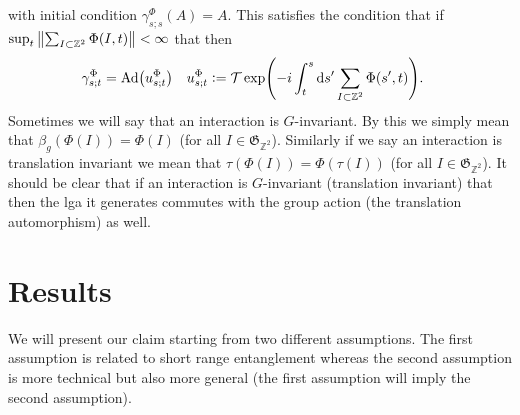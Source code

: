 \documentclass[12pt,a4paper,twoside]{article}
\renewcommand{\d}{\text{d}}
\newcommand{\defeq}{\vcentcolon=}
\let\originalleft\left
\let\originalright\right
\renewcommand{\left}{\mathopen{}\mathclose\bgroup\originalleft}
\renewcommand{\right}{\aftergroup\egroup\originalright}
\newcommand{\ZZ}{\mathbb Z}
\newcommand{\Ad}[1]{\textrm{Ad}\left(#1\right)}
\theoremstyle{definition}
\numberwithin{equation}{section}
\begin{document}
with initial condition $\gamma^{\Phi}_{s;s}(A)=A$. This satisfies the condition that if $\sup_t\norm{\sum_{I\subset\ZZ^2}\Phi(I,t)}<\infty$ that then
\begin{align}
	\gamma^\Phi_{s;t}&=\Ad{u^\Phi_{s;t}}&u^\Phi_{s;t}&\defeq\mathcal{T}\exp(-i\int_t^s\d s'\sum_{I\subset\ZZ^2}\Phi(s',t)).
\end{align}
Sometimes we will say that an interaction is $G$-invariant. By this we simply mean that $\beta_g(\Phi(I))=\Phi(I)$ (for all $I\in\mathfrak{G}_{\ZZ^2}$). Similarly if we say an interaction is translation invariant we mean that $\tau(\Phi(I))=\Phi(\tau(I))$ (for all $I\in\mathfrak{G}_{\ZZ^2}$). It should be clear that if an interaction is $G$-invariant (translation invariant) that then the lga it generates commutes with the group action (the translation automorphism) as well.
\section{Results}
We will present our claim starting from two different assumptions. The first assumption is related to short range entanglement whereas the second assumption is more technical but also more general (the first assumption will imply the second assumption).
\end{document}
